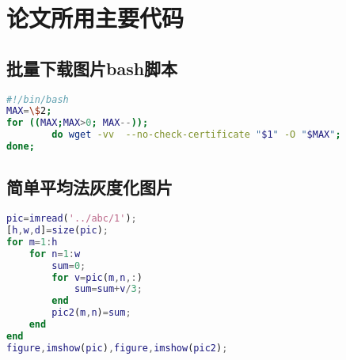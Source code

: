 \section{论文所用主要代码}\label{sec:code}
\subsection{批量下载图片bash脚本}\label{ssec:download_shell}
\begin{lstlisting}[caption=批量下载图片bash脚本,language=bash]
#!/bin/bash
MAX=\$2;
for ((MAX;MAX>0; MAX--));
        do wget -vv  --no-check-certificate "$1" -O "$MAX";
done;
\end{lstlisting}

\subsection{简单平均法灰度化图片}\label{ssec:gray_pic}
\begin{lstlisting}[caption=简单平均法灰度化图片,language=matlab]
pic=imread('../abc/1');
[h,w,d]=size(pic);
for m=1:h
    for n=1:w
        sum=0;
        for v=pic(m,n,:)
            sum=sum+v/3;
        end
        pic2(m,n)=sum;
    end
end
figure,imshow(pic),figure,imshow(pic2);
\end{lstlisting}
